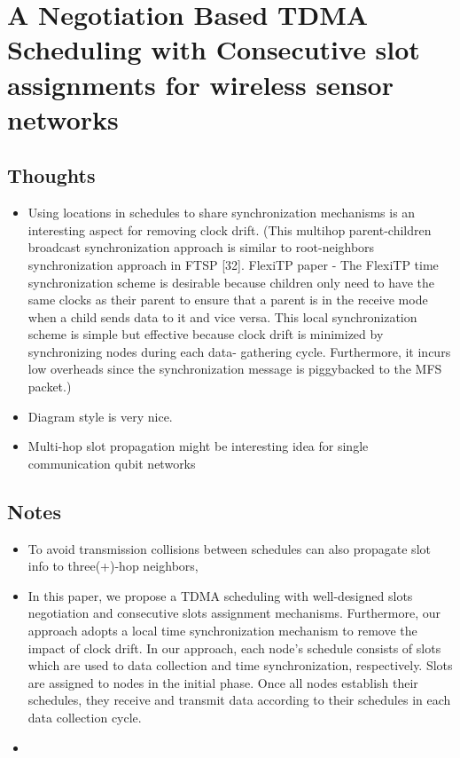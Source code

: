 \documentclass{article}
\begin{document}
\section{A Negotiation Based TDMA Scheduling with Consecutive slot assignments for wireless sensor networks}

\subsection{Thoughts}
\begin{itemize}
	\item Using locations in schedules to share synchronization mechanisms is an interesting aspect for removing clock drift. (This multihop parent-children broadcast synchronization approach is similar to root-neighbors synchronization approach in FTSP [32]. FlexiTP paper - The
FlexiTP time synchronization scheme is desirable because children only need to have the same clocks as their parent to ensure that a parent is in the receive mode when a child sends data to it and vice versa. This local synchronization scheme is simple but effective because clock drift is minimized by synchronizing nodes during each data- gathering cycle. Furthermore, it incurs low overheads since the synchronization message is piggybacked to the MFS packet.)
    \item Diagram style is very nice.
    \item Multi-hop slot propagation might be interesting idea for single communication qubit networks
\end{itemize}

\subsection{Notes}
\begin{itemize}
    \item To avoid transmission collisions between schedules can also propagate slot info to three(+)-hop neighbors,
    \item In this paper, we propose a TDMA scheduling with well-designed slots negotiation and consecutive slots assignment mechanisms. Furthermore, our approach adopts a local time synchronization mechanism to remove the impact of clock drift. In our approach, each node’s schedule consists of slots which are used to data collection and time synchronization, respectively. Slots are assigned to nodes in the initial phase. Once all nodes establish their schedules, they receive and transmit data according to their schedules in each data collection cycle.
    \item 
\end{itemize}
\end{document}

